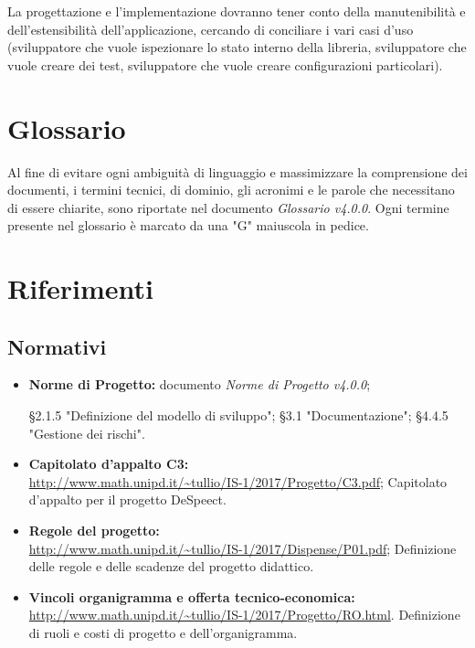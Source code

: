 \documentclass[../PianodiProgetto.tex]{subfiles}
\begin{document}
	\noindent La progettazione e l'implementazione dovranno tener conto della manutenibilità e dell'estensibilità dell'applicazione, cercando di conciliare i vari casi d'uso (sviluppatore che vuole ispezionare lo stato interno della libreria, sviluppatore che vuole creare dei test, sviluppatore che vuole creare configurazioni particolari). 
	
	\section{Glossario}
	Al fine di evitare ogni ambiguità di linguaggio e massimizzare la comprensione dei documenti, i termini tecnici, di dominio, gli acronimi e le parole che necessitano di essere chiarite, sono riportate nel documento \textit{Glossario v4.0.0}. Ogni termine presente nel glossario è marcato da una "G" maiuscola in pedice.
	
	\section{Riferimenti}
	
	\subsection*{Normativi}
	\begin{itemize}
		\item \textbf{Norme di Progetto:} documento \textit{Norme di Progetto v4.0.0};
		\begin{itemize}
			\subitem §2.1.5 "Definizione del modello di sviluppo";
			\subitem §3.1 "Documentazione";
			\subitem §4.4.5 "Gestione dei rischi".
		\end{itemize}
		\item \textbf{Capitolato d'appalto C3:} \\ \url{http://www.math.unipd.it/~tullio/IS-1/2017/Progetto/C3.pdf};
		\subitem Capitolato d'appalto per il progetto DeSpeect.
		\item \textbf{Regole del progetto:}\\ \url{http://www.math.unipd.it/~tullio/IS-1/2017/Dispense/P01.pdf};
		\subitem Definizione delle regole e delle scadenze del progetto didattico.
		\item \textbf{Vincoli organigramma e offerta tecnico-economica:}\\ \url{http://www.math.unipd.it/~tullio/IS-1/2017/Progetto/RO.html}.
		\subitem Definizione di ruoli e costi di progetto e dell'organigramma.
	\end{itemize}
	
\end{document}
